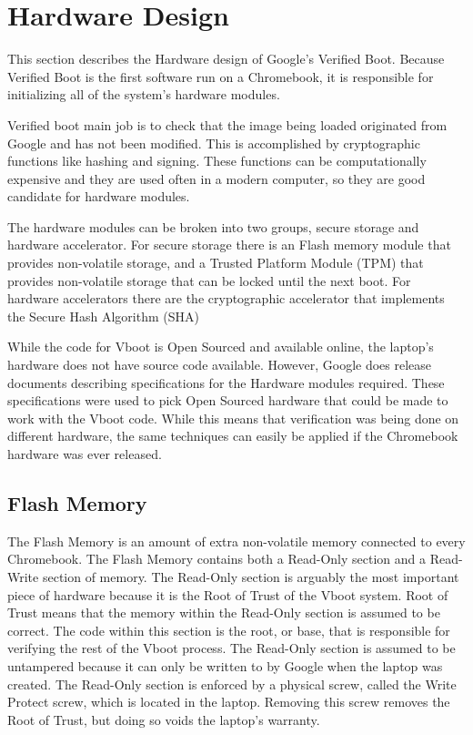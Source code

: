 \documentclass[../report.tex]{subfiles}
\begin{document}
\onehalfspacing

\newpage
\section{Hardware Design}

This section describes the Hardware design of Google's Verified Boot. 
Because Verified Boot is the first software run on a Chromebook, it is
responsible for initializing all of the system's hardware modules.

Verified boot main job is to check that the image being loaded originated from
Google and has not been modified. 
This is accomplished by cryptographic functions like hashing and signing.
These functions can be computationally expensive and they are used often in a
modern computer, so they are good candidate for hardware modules.  

The hardware modules can be broken into two groups, secure storage and hardware accelerator.
For secure storage there is an Flash memory module that provides non-volatile storage, and a Trusted Platform Module (TPM) that provides non-volatile storage that can be locked until the next boot.
For hardware accelerators there are the cryptographic accelerator that
implements the Secure Hash Algorithm (SHA) 

While the code for Vboot is Open Sourced and available online, the laptop's
hardware does not have source code available.
However, Google does release documents describing specifications for the
Hardware modules required. 
These specifications were used to pick Open Sourced hardware that could be made
to work with the Vboot code. 
While this means that verification was being done on different hardware, the
same techniques can easily be applied if the Chromebook hardware was ever
released.

\subsection{Flash Memory}\label{flash_mem}

The Flash Memory is an amount of extra non-volatile memory connected to every Chromebook. 
The Flash Memory contains both a Read-Only section and a Read-Write section of memory.
The Read-Only section is arguably the most important piece of hardware because it is the Root of Trust of the Vboot system.
Root of Trust means that the memory within the Read-Only section is assumed to be correct.
The code within this section is the root, or base, that is responsible for verifying the rest of the Vboot process.
The Read-Only section is assumed to be untampered because it can only be written
to by Google when the laptop was created.
The Read-Only section is enforced by a physical screw, called the Write Protect screw, which is located in the laptop.
Removing this screw removes the Root of Trust, but doing so voids the laptop's warranty.
\end{document}
